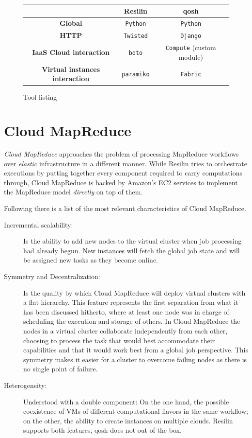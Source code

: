 \begin{figure}[tbp]
\begin{center}
\begin{tabular}{|c|c|c|}
\hline
& \textbf{Resilin} & \textbf{qosh} \\
\hline
\textbf{Global} & \texttt{Python} & \texttt{Python} \\
\hline
\textbf{HTTP} & \texttt{Twisted} & \texttt{Django} \\
\hline
\textbf{IaaS Cloud interaction} & \texttt{boto} & \texttt{Compute} (custom module) \\
\hline
\textbf{Virtual instances interaction} & \texttt{paramiko} & \texttt{Fabric} \\
\hline
\end{tabular}
\caption{Tool listing}
\label{fig:resilinproyecto}
\end{center}
\end{figure}

\section{Cloud MapReduce}\label{sec:cloudmapred}
\noindent \emph{Cloud MapReduce} approaches the problem of processing MapReduce workflows over \emph{elastic} infrastructure in a different manner. While Resilin tries to orchestrate executions by putting together every component required to carry computations through, Cloud MapReduce is backed by Amazon's EC2 services to implement the MapReduce model \cite{googlemapreduce} \emph{directly} on top of them.

Following there is a list of the most relevant characteristics of Cloud MapReduce.

\begin{description}
    \item[Incremental scalability:] Is the ability to add new nodes to the virtual cluster when job processing had already begun. New instances will fetch the global job state and will be assigned new tasks as they become online.
    \item[Symmetry and Decentralization:] Is the quality by which Cloud MapReduce will deploy virtual clusters with a flat hierarchy. This feature represents the first separation from what it has been discussed hitherto, where at least one node was in charge of scheduling the execution and storage of others. In Cloud MapReduce the nodes in a virtual cluster collaborate independently from each other, choosing to process the task that would best accommodate their capabilities and that it would work best from a global job perspective. This symmetry makes it easier for a cluster to overcome failing nodes as there is no single point of failure.
    \item[Heterogeneity:] Understood with a double component: On the one hand, the possible coexistence of VMs of different computational flavors in the same workflow; on the other, the ability to create instances on multiple clouds. Resilin supports both features, qosh does not out of the box.
\end{description}

